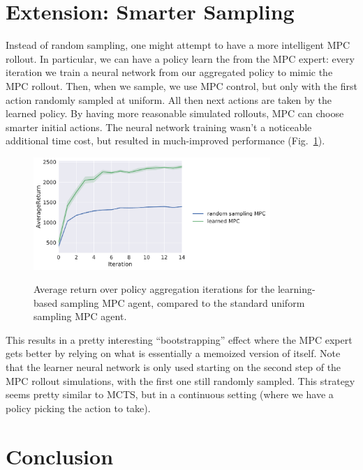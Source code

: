 \documentclass{article}
\begin{document}
\FloatBarrier

\section{Extension: Smarter Sampling}\label{smart-sample}

Instead of random sampling, one might attempt to have a more intelligent MPC rollout. In particular, we can have a policy learn the from the MPC expert: every iteration we train a neural network from our aggregated policy to mimic the MPC rollout. Then, when we sample, we use MPC control, but only with the first action randomly sampled at uniform. All then next actions are taken by the learned policy. By having more reasonable simulated rollouts, MPC can choose smarter initial actions. The neural network training wasn't a noticeable additional time cost, but resulted in much-improved performance (Fig.~\ref{fig:mpcmf}).

\begin{figure}[!h]
  \begin{center}
    {\includegraphics[width=0.8\textwidth]{mpcmf-AverageReturn.pdf}}
  \end{center}
  \caption{Average return over policy aggregation iterations for the learning-based sampling MPC agent, compared to the standard uniform sampling MPC agent.}
\label{fig:mpcmf}
\end{figure}

This results in a pretty interesting ``bootstrapping'' effect where the MPC expert gets better by relying on what is essentially a memoized version of itself. Note that the learner neural network is only used starting on the second step of the MPC rollout simulations, with the first one still randomly sampled. This strategy seems pretty similar to MCTS, but in a continuous setting (where we have a policy picking the action to take).

\FloatBarrier

\section{Conclusion}
\end{document}
